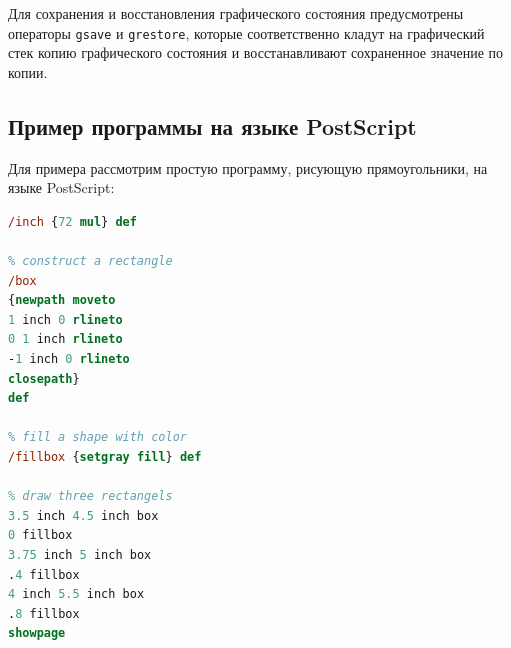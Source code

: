 Для сохранения и восстановления графического состояния предусмотрены операторы \texttt{gsave} и \texttt{grestore}, которые соответственно кладут на графический стек копию графического состояния и восстанавливают сохраненное значение по копии.


\subsection{Пример программы на языке PostScript}
Для примера рассмотрим простую программу, рисующую прямоугольники, на языке PostScript: 

\begin{lstlisting}[label=PostScript-example,caption=Простая программа на языке PostScript, language = PostScript]
% transform inches to pixels
/inch {72 mul} def

% construct a rectangle
/box        
{newpath moveto
1 inch 0 rlineto
0 1 inch rlineto
-1 inch 0 rlineto
closepath} 
def

% fill a shape with color
/fillbox {setgray fill} def

% draw three rectangels
3.5 inch 4.5 inch box
0 fillbox
3.75 inch 5 inch box
.4 fillbox
4 inch 5.5 inch box
.8 fillbox
showpage
\end{lstlisting}

